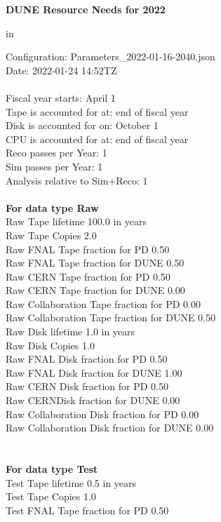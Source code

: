\documentclass[12pt]{article}
\begin{document}
\centerline{\bf{DUNE Resource Needs for 2022}} in \par Configuration: Parameters\_2022-01-16-2040.json\\
  Date: 2022-01-24 14:52TZ\\
   \\
  
 Fiscal year starts: April 1\\ 
Tape is accounted for at: end of fiscal year\\ 
Disk is accounted for on: October 1\\ 
CPU is accounted for at: end of fiscal year\\ 
Reco passes per Year: 1\\
Sim passes per Year: 1\\
Analysis relative to Sim+Reco: 1\\
\pagebreak
\\
{\bf For data type Raw}\\
   Raw Tape lifetime 100.0 in years\\
   Raw Tape Copies   2.0\\
   Raw FNAL Tape fraction for PD  0.50\\
   Raw FNAL Tape fraction for DUNE  0.50\\
   Raw CERN Tape fraction for PD  0.50\\
   Raw CERN Tape fraction for DUNE  0.00\\
   Raw Collaboration Tape fraction for PD  0.00\\
   Raw Collaboration Tape fraction for DUNE  0.50\\
   Raw Disk lifetime   1.0 in years\\
   Raw Disk Copies   1.0\\
   Raw FNAL Disk fraction for PD  0.50\\
   Raw FNAL Disk fraction for DUNE  1.00\\
   Raw CERN Disk fraction for PD  0.50\\
   Raw CERNDisk fraction for DUNE  0.00\\
   Raw Collaboration Disk fraction for PD  0.00\\
   Raw Collaboration Disk fraction for DUNE  0.00\\
\pagebreak\\
\\
{\bf For data type Test}\\
  Test Tape lifetime   0.5 in years\\
  Test Tape Copies   1.0\\
  Test FNAL Tape fraction for PD  0.50\\
\end{document}
